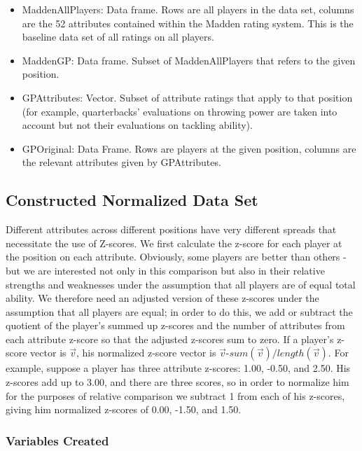 \documentclass[11pt]{article}
\begin{document}
\begin{itemize}
\item{MaddenAllPlayers}: Data frame. Rows are all players in the data set, columns are the 52 attributes contained within the Madden rating system. This is the baseline data set of all ratings on all players.
\item{MaddenGP}: Data frame. Subset of MaddenAllPlayers that refers to the given position.
\item{GPAttributes}: Vector. Subset of attribute ratings that apply to that position (for example, quarterbacks' evaluations on throwing power are taken into account but not their evaluations on tackling ability).
\item{GPOriginal}: Data Frame. Rows are players at the given position, columns are the relevant attributes given by GPAttributes.
\end{itemize}

\subsection{Constructed Normalized Data Set}

Different attributes across different positions have very different spreads that necessitate the use of Z-scores. We first calculate the z-score for each player at the position on each attribute. Obviously, some players are better than others - but we are interested not only in this comparison but also in their relative strengths and weaknesses under the assumption that all players are of equal total ability. We therefore need an adjusted version of these z-scores under the assumption that all players are equal; in order to do this, we add or subtract the quotient of the player's summed up z-scores and the number of attributes from each attribute z-score so that the adjusted z-scores sum to zero. 
If a player's z-score vector is $\vec{v}$, his normalized z-score vector is $\vec{v}$-$sum(\vec{v})/length(\vec{v})$.
For example, suppose a player has three attribute z-scores: 1.00, -0.50, and 2.50. His z-scores add up to 3.00, and there are three scores, so in order to normalize him for the purposes of relative comparison we subtract 1 from each of his z-scores, giving him normalized z-scores of 0.00, -1.50, and 1.50.

\subsubsection{Variables Created}
\end{document}

